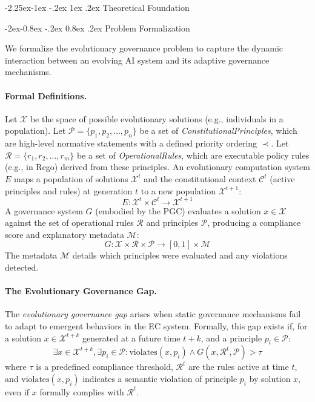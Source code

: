 \documentclass[manuscript,screen,9pt]{acmart}
\makeatletter
\renewcommand\subsection{\@startsection{subsection}{2}{\z@}%
  {-2.25ex\@plus -1ex \@minus -.2ex}%
  {1ex \@plus .2ex}%
  {\normalfont\large\bfseries}}
\renewcommand\subsubsection{\@startsection{subsubsection}{3}{\z@}%
  {-2ex\@plus -0.8ex \@minus -.2ex}%
  {0.8ex \@plus .2ex}%
  {\normalfont\normalsize\bfseries}}
\makeatother
\begin{document}
\subsection{Theoretical Foundation}
\label{subsec:theoretical_foundation}

\subsubsection{Problem Formalization}
\label{subsubsec:problem_formalization}

We formalize the evolutionary governance problem to capture the dynamic interaction between an evolving AI system and its adaptive governance mechanisms.

\paragraph{Formal Definitions.} Let $\mathcal{X}$ be the space of possible evolutionary solutions (e.g., individuals in a population). Let $\mathcal{P} = \{p_1, p_2, \ldots, p_n\}$ be a set of \textit{ConstitutionalPrinciples}, which are high-level normative statements with a defined priority ordering $\prec$. Let $\mathcal{R} = \{r_1, r_2, \ldots, r_m\}$ be a set of \textit{OperationalRules}, which are executable policy rules (e.g., in Rego) derived from these principles. An evolutionary computation system $E$ maps a population of solutions $\mathcal{X}^t$ and the constitutional context $\mathcal{C}^t$ (active principles and rules) at generation $t$ to a new population $\mathcal{X}^{t+1}$:
\[E: \mathcal{X}^t \times \mathcal{C}^t \rightarrow \mathcal{X}^{t+1}\]
A governance system $G$ (embodied by the PGC) evaluates a solution $x \in \mathcal{X}$ against the set of operational rules $\mathcal{R}$ and principles $\mathcal{P}$, producing a compliance score and explanatory metadata $\mathcal{M}$:
\[G: \mathcal{X} \times \mathcal{R} \times \mathcal{P} \rightarrow [0,1] \times \mathcal{M}\]
The metadata $\mathcal{M}$ details which principles were evaluated and any violations detected.

\paragraph{The Evolutionary Governance Gap.} The \textit{evolutionary governance gap} arises when static governance mechanisms fail to adapt to emergent behaviors in the EC system. Formally, this gap exists if, for a solution $x \in \mathcal{X}^{t+k}$ generated at a future time $t+k$, and a principle $p_i \in \mathcal{P}$:
\[\exists x \in \mathcal{X}^{t+k}, \exists p_i \in \mathcal{P}: \text{violates}(x, p_i) \land G(x, \mathcal{R}^t, \mathcal{P}) > \tau\]
where $\tau$ is a predefined compliance threshold, $\mathcal{R}^t$ are the rules active at time $t$, and $\text{violates}(x, p_i)$ indicates a semantic violation of principle $p_i$ by solution $x$, even if $x$ formally complies with $\mathcal{R}^t$.
\end{document}
